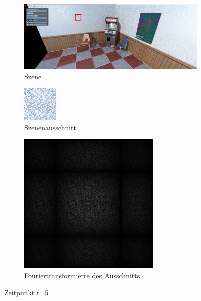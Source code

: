 \begin{figure}[H]
    \begin{subfigure}{\textwidth}   
        \centering \includegraphics[scale=.2]{content/TemporalerAlg/Bilder/Screenshotreihe/frame_t_5.0.png}
        \caption{Szene}
        \label{fig:Szene_t1}
    \end{subfigure}
    \begin{subfigure}{0.5\textwidth}
        \centering\includegraphics[width=0.5\linewidth]{content/TemporalerAlg/Bilder/Screenshotreihe/frame_t_5.0_64x64.png} 
        \caption{Szenenausschnitt}
        \label{fig:ausschnitt_t5}
    \end{subfigure}
    \begin{subfigure}{0.6\textwidth}
        \centering\includegraphics[width=0.5\linewidth]{content/TemporalerAlg/Bilder/Screenshotreihe/spektrum/frame_t_5.0_64x64_fourier.png}
        \caption{Fouriertransformierte des Ausschnitts}
        \label{fig:Fouriertransformierte_t5}
    \end{subfigure}
        \caption{Zeitpunkt t=5}
        \label{fig:Verlauf_t5}
\end{figure}

